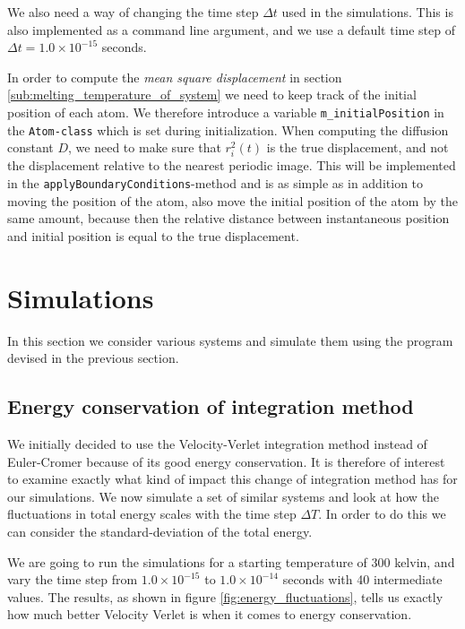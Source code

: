 \documentclass[a4paper]{article}
\begin{document}
    We also need a way of changing the time step $\Delta t$ used in the
    simulations. This is also implemented as a command line argument, and we
    use a default time step of $\Delta t = 1.0 \times 10^{-15}$ seconds.
    
    In order to compute the \emph{mean square displacement} in section
    \ref{sub:melting_temperature_of_system} we need to keep track of the
    initial position of each atom. We therefore introduce a variable
    \texttt{m\_initialPosition} in the \texttt{Atom-class} which is set during
    initialization.  When computing the diffusion constant $D$, we need to make
    sure that $r_i^2(t)$ is the true displacement, and not the displacement
    relative to the nearest periodic image. This will be implemented in the
    \texttt{applyBoundaryConditions}-method and is as simple as in addition to
    moving the position of the atom, also move the initial position of the atom
    by the same amount, because then the relative distance between instantaneous
    position and initial position is equal to the true displacement.

\section{Simulations}
\label{sec:simulations}

In this section we consider various systems and simulate them using the program
devised in the previous section.

    \subsection{Energy conservation of integration method}
    \label{sub:energy_conservation_of_integration_method}

    We initially decided to use the Velocity-Verlet integration method instead of
    Euler-Cromer because of its good energy conservation. It is therefore of
    interest to examine exactly what kind of impact this change of integration
    method has for our simulations.  We now simulate a set of similar systems and
    look at how the fluctuations in total energy scales with the time step $\Delta
    T$. In order to do this we can consider the standard-deviation of the total
    energy. 

    We are going to run the simulations for a starting temperature of 300 kelvin,
    and vary the time step from $1.0 \times 10^{-15}$ to $1.0 \times 10^{-14}$
    seconds with 40 intermediate values. The results, as shown in figure
    \ref{fig:energy_fluctuations}, tells us exactly how much better Velocity Verlet
    is when it comes to energy conservation.
\end{document}
